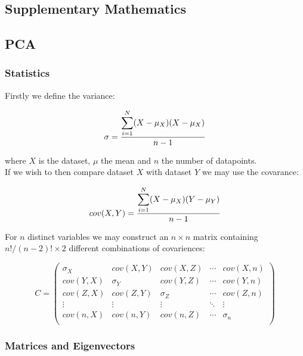 \begin{appendices}


   \chapter{Supplementary Mathematics}

  \section{PCA} \label{appendix:pca}
  \subsection{Statistics}

  Firstly we define the variance:

  \begin{equation}
      \sigma = \frac{ \mathlarger{\sum}_{i=1}^{N} (X-\mu_X)(X-\mu_X)}{n-1}
  \end{equation}

  where $X$ is the dataset, $\mu$ the mean and $n$ the number of datapoints.\\

  If we wish to then compare dataset $X$ with dataset $Y$ we may use the covarance:

  \begin{equation}
      cov(X,Y) = \frac{ \mathlarger{\sum}_{i=1}^{N} (X-\mu_X)(Y-\mu_Y)}{n-1}
  \end{equation}

  For $n$ distinct variables we may construct an $n \times n$ matrix containing $n!/(n-2)!\times 2$ different combinations of covariences:



  \[
  C=
    \begin{pmatrix}
      \sigma_X & cov(X,Y) & cov(X,Z)& \cdots & cov(X,n) \\
      cov(Y,X) & \sigma_Y & cov(Y,Z)& \cdots & cov(Y,n) \\
      cov(Z,X)& cov(Z,Y) & \sigma_Z& \cdots & cov(Z,n) \\
      \vdots & \vdots & \vdots & \ddots & \vdots \\
      cov(n,X) & cov(n,Y) & cov(n,Z)& \cdots & \sigma_n \\
    \end{pmatrix}
  \]

  \subsection{Matrices and Eigenvectors}


\end{appendices}

